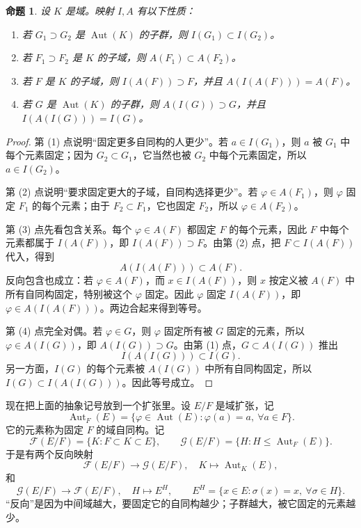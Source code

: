 \documentclass[11pt,a4paper,openany]{ctexbook}
\numberwithin{equation}{chapter}
\theoremstyle{plain}
\newtheorem{proposition}[theorem]{命题}
\theoremstyle{definition}
\theoremstyle{remark}
\begin{document}
\begin{proposition}
设 $K$ 是域。映射 $I,A$ 有以下性质：
\begin{enumerate}[label=(\arabic*)]
\item 若 $G_1\supset G_2$ 是 $\operatorname{Aut}(K)$ 的子群，则 $I(G_1)\subset I(G_2)$。
\item 若 $F_1\supset F_2$ 是 $K$ 的子域，则 $A(F_1)\subset A(F_2)$。
\item 若 $F$ 是 $K$ 的子域，则 $I(A(F))\supset F$，并且 $A(I(A(F)))=A(F)$。
\item 若 $G$ 是 $\operatorname{Aut}(K)$ 的子群，则 $A(I(G))\supset G$，并且 $I(A(I(G)))=I(G)$。
\end{enumerate}
\end{proposition}

\begin{proof}
第 (1) 点说明“固定更多自同构的人更少”。若 $a\in I(G_1)$，则 $a$ 被 $G_1$ 中每个元素固定；因为 $G_2\subset G_1$，它当然也被 $G_2$ 中每个元素固定，所以 $a\in I(G_2)$。

第 (2) 点说明“要求固定更大的子域，自同构选择更少”。若 $\varphi\in A(F_1)$，则 $\varphi$ 固定 $F_1$ 的每个元素；由于 $F_2\subset F_1$，它也固定 $F_2$，所以 $\varphi\in A(F_2)$。

第 (3) 点先看包含关系。每个 $\varphi\in A(F)$ 都固定 $F$ 的每个元素，因此 $F$ 中每个元素都属于 $I(A(F))$，即 $I(A(F))\supset F$。由第 (2) 点，把 $F\subset I(A(F))$ 代入，得到
\[
A(I(A(F)))\subset A(F).
\]
反向包含也成立：若 $\varphi\in A(F)$，而 $x\in I(A(F))$，则 $x$ 按定义被 $A(F)$ 中所有自同构固定，特别被这个 $\varphi$ 固定。因此 $\varphi$ 固定 $I(A(F))$，即 $\varphi\in A(I(A(F)))$。两边合起来得到等号。

第 (4) 点完全对偶。若 $\varphi\in G$，则 $\varphi$ 固定所有被 $G$ 固定的元素，所以 $\varphi\in A(I(G))$，即 $A(I(G))\supset G$。由第 (1) 点，$G\subset A(I(G))$ 推出
\[
I(A(I(G)))\subset I(G).
\]
另一方面，$I(G)$ 的每个元素被 $A(I(G))$ 中所有自同构固定，所以 $I(G)\subset I(A(I(G)))$。因此等号成立。
\end{proof}

现在把上面的抽象记号放到一个扩张里。设 $E/F$ 是域扩张，记
\[
\operatorname{Aut}_F(E)=\{\varphi\in\operatorname{Aut}(E):\varphi(a)=a,\ \forall a\in F\}.
\]
它的元素称为固定 $F$ 的域自同构。记
\[
\mathcal F(E/F)=\{K:F\subset K\subset E\},\qquad
\mathcal G(E/F)=\{H:H\le \operatorname{Aut}_F(E)\}.
\]
于是有两个反向映射
\[
\mathcal F(E/F)\longrightarrow\mathcal G(E/F),\quad
K\longmapsto\operatorname{Aut}_K(E),
\]
和
\[
\mathcal G(E/F)\longrightarrow\mathcal F(E/F),\quad
H\longmapsto E^H,
\qquad
E^H=\{x\in E:\sigma(x)=x,\ \forall\sigma\in H\}.
\]
“反向”是因为中间域越大，要固定它的自同构越少；子群越大，被它固定的元素越少。
\end{document}
